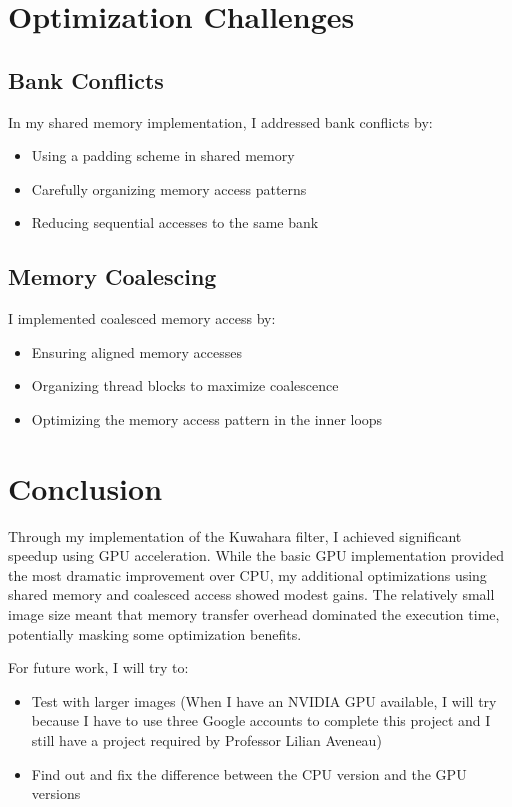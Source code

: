 \documentclass[12pt]{article}
\begin{document}
\section{Optimization Challenges}

\subsection{Bank Conflicts}
In my shared memory implementation, I addressed bank conflicts by:
\begin{itemize}
    \item Using a padding scheme in shared memory
    \item Carefully organizing memory access patterns
    \item Reducing sequential accesses to the same bank
\end{itemize}

\subsection{Memory Coalescing}
I implemented coalesced memory access by:
\begin{itemize}
    \item Ensuring aligned memory accesses
    \item Organizing thread blocks to maximize coalescence
    \item Optimizing the memory access pattern in the inner loops
\end{itemize}

\section{Conclusion}
Through my implementation of the Kuwahara filter, I achieved significant speedup using GPU acceleration. While the basic GPU implementation provided the most dramatic improvement over CPU, my additional optimizations using shared memory and coalesced access showed modest gains. The relatively small image size meant that memory transfer overhead dominated the execution time, potentially masking some optimization benefits.

For future work, I will try to:
\begin{itemize}
    \item Test with larger images (When I have an NVIDIA GPU available, I will try because I have to use three Google accounts to complete this project and I still have a project required by Professor Lilian Aveneau)
    \item Find out and fix the difference between the CPU version and the GPU versions
\end{itemize}
\end{document}
